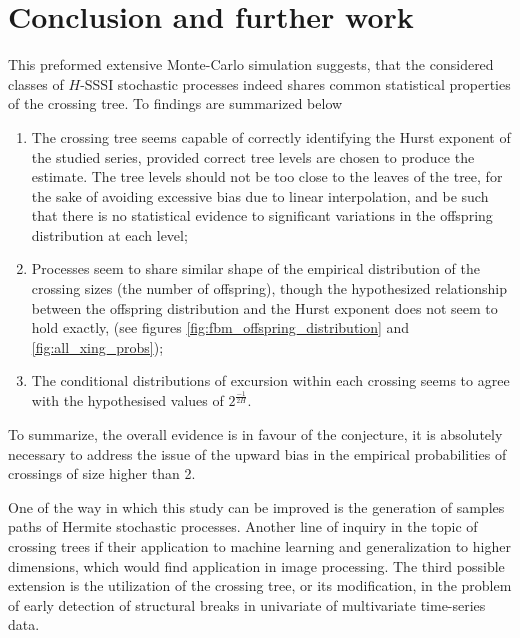 \chapter{Conclusion and further work} %
\label{cha:conlusion_and_further_work}

This preformed extensive Monte-Carlo simulation suggests, that the considered
classes of $H$-SSSI stochastic processes indeed shares common statistical properties
of the crossing tree. To findings are summarized below \begin{enumerate}
	\item The crossing tree seems capable of correctly identifying the Hurst
	exponent of the studied series, provided correct tree levels are chosen to
	produce the estimate. The tree levels should not be too close to the leaves
	of the tree, for the sake of avoiding excessive bias due to linear interpolation,
	and be such that there is no statistical evidence to significant variations
	in the offspring distribution at each level;
	\item Processes seem to share similar shape of the empirical distribution of
	the crossing sizes (the number of offspring), though the hypothesized
	relationship between the offspring distribution and the Hurst exponent
	does not seem to hold exactly, (see figures \ref{fig:fbm_offspring_distribution}
	and \ref{fig:all_xing_probs});
	\item The conditional distributions of excursion within each crossing seems
	to agree with the hypothesised values of $2^\frac{-1}{2H}$.
\end{enumerate}
To summarize, the overall evidence is in favour of the conjecture, it is absolutely
necessary to address the issue of the upward bias in the empirical probabilities of
crossings of size higher than 2.

One of the way in which this study can be improved is the generation of samples paths
of Hermite stochastic processes. Another line of inquiry in the topic of crossing trees
if their application to machine learning and generalization to higher dimensions, which
would find application in image processing. The third possible extension is the utilization
of the crossing tree, or its modification, in the problem of early detection of structural
breaks in univariate of multivariate time-series data.

